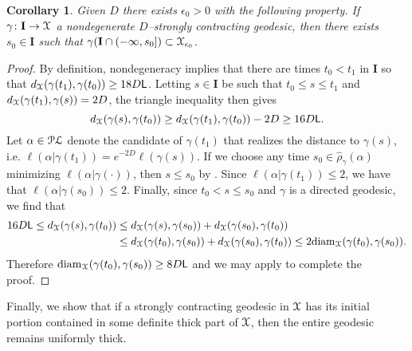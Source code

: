 \documentclass[letterpaper,fleqn]{article}
\theoremstyle{plain}
\newtheorem{corollary}[theorem]{Corollary}
\theoremstyle{definition}
\DeclareMathOperator{\diam}{diam}
\newcommand{\pl}{{\EuScript{PL}}} %
\newcommand{\os}{{\EuScript X}} %
\newcommand{\X}{\os}
\newcommand{\plproj}{\pi_\pl} %
\newcommand{\len}{\ell}  %
\newcommand{\minlen}{m}  %
\newcommand{\minpts}{\rho} %
\newcommand{\mintime}{\hat{\minpts}} %
\newcommand{\lipconst}{{\sf L}} %
\renewcommand{\diam}{\mathrm{diam}}
\newcommand{\I}{\mathbf{I}}
\begin{document}
\begin{corollary} \label{cor:nondegen_implies_min}
Given $D$ there exists $\epsilon_0> 0$ with the following property. If $\gamma\colon\I\to\os$ a nondegenerate $D$--strongly contracting geodesic, then there exists $s_0\in \I$ such that $\gamma(\I\cap (-\infty,s_0]) \subset \X_{\epsilon_0}$.
\end{corollary}
\begin{proof}
By definition, nondegeneracy implies that there are times $t_0 <t_1$ in $\I$ so that $d_\X(\gamma(t_1),\gamma(t_0)) \ge 18D\lipconst$. Letting $s \in \I$ be such that $t_0 \le s \le t_1$ and $d_\X(\gamma(t_1), \gamma(s)) = 2D$, the triangle inequality then gives
\[d_\os(\gamma(s),\gamma(t_0)) \ge d_\os(\gamma(t_1),\gamma(t_0)) - 2D \ge 16D\lipconst.\]
Let $\alpha \in \pl$ denote the candidate of $\gamma(t_1)$ that realizes the distance to $\gamma(s)$, i.e. $\ell(\alpha|\gamma(t_1)) = e^{-2D}\ell(\gamma(s))$. If we choose any time $s_0\in\mintime_\gamma(\alpha)$ minimizing $\len(\alpha| \gamma(\cdot))$, then $s \le s_0$ by . Since $\ell(\alpha| \gamma(t_1)) \le 2$, we have that $\ell(\alpha | \gamma(s_0)) \le 2$. Finally, since $t_0 < s\le s_0$ and $\gamma$ is a directed geodesic, we find that
\begin{align*}
16D\lipconst \le d_\os(\gamma(s),\gamma(t_0)) &\le d_\os(\gamma(s),\gamma(s_0)) + d_\os(\gamma(s_0),\gamma(t_0))\\
&\le d_\os(\gamma(t_0),\gamma(s_0)) + d_\os(\gamma(s_0),\gamma(t_0)) \le 2\diam_\os(\gamma(t_0),\gamma(s_0)).
\end{align*}
Therefore $\diam_\os(\gamma(t_0),\gamma(s_0))\ge 8D\lipconst$ and we may apply  to complete the proof.
\end{proof}

Finally, we show that if a strongly contracting geodesic in $\X$ has its initial portion contained in some definite thick part of $\X$, then the entire geodesic remains uniformly thick.
\end{document}
